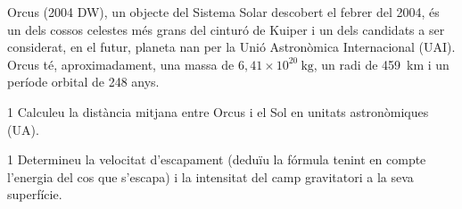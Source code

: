 Orcus (2004 DW), un objecte del Sistema Solar descobert el febrer del 2004, és un dels cossos celestes més grans del cinturó de Kuiper i un dels candidats a ser considerat, en el futur, planeta nan per la Unió Astronòmica Internacional (UAI). Orcus té, aproximadament, una massa de $6,41\times 10^{20}\ \mathrm{kg}$, un radi de 459~km i un període orbital de 248 anys.


\begin{apartat}{1}
Calculeu la distància mitjana entre Orcus i el Sol en unitats astronòmiques (UA).
\end{apartat}

\begin{apartat}{1}
Determineu la velocitat d'escapament (deduïu la fórmula tenint en compte l'energia del cos que s'escapa) i la intensitat del camp gravitatori a la seva superfície.
\end{apartat}

